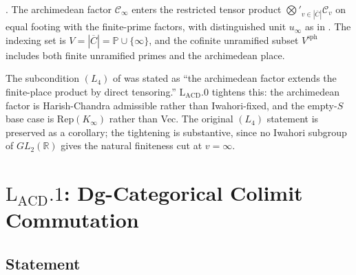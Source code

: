 \begin{corollary}
\label{v4-arith:lacd:cor:arch-factor-enters}
\ClaimStatusProvedHere. The archimedean factor \(\mathcal{C}_{\infty}\)
enters the restricted tensor product
\(\bigotimes'_{v \in |\overline{C}|}\mathcal{C}_{v}\) on equal footing
with the finite-prime factors, with distinguished unit
\(u_{\infty}\) as in . The indexing
set is \(V = |\overline{C}| = \mathbb{P} \cup \{\infty\}\), and the
cofinite unramified subset \(V^{\mathrm{sph}}\) includes both
finite unramified primes and the archimedean place.
\end{corollary}

\begin{remark}
\label{v4-arith:lacd:rem:L4-reconciliation}
The subcondition \((L_{4})\) of 
was stated as ``the archimedean factor extends the finite-place product by
direct tensoring.'' \(\mathrm{L}_{\mathrm{ACD}}.0\) tightens this: the
archimedean factor is Harish-Chandra admissible rather than Iwahori-fixed,
and the empty-\(S\) base case is \(\mathrm{Rep}(K_{\infty})\) rather than
Vec. The original \((L_{4})\) statement is preserved as a corollary;
the tightening is substantive, since no Iwahori subgroup of
\(GL_{2}(\mathbb{R})\) gives the natural finiteness cut at \(v = \infty\).
\end{remark}

\section{\(\mathrm{L}_{\mathrm{ACD}}.1\): Dg-Categorical Colimit Commutation}
\label{v4-arith:lacd:L1}

\subsection{Statement}

